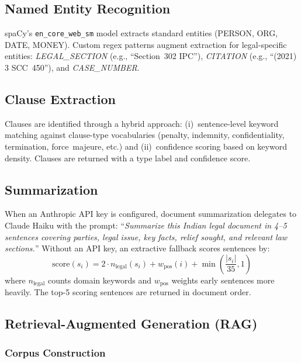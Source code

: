 \documentclass[conference]{IEEEtran}
\begin{document}
\subsection{Named Entity Recognition}

spaCy's \texttt{en\_core\_web\_sm} model extracts standard entities (PERSON,
ORG, DATE, MONEY). Custom regex patterns augment extraction for legal-specific
entities: \textit{LEGAL\_SECTION} (e.g., ``Section~302 IPC''),
\textit{CITATION} (e.g., ``(2021) 3 SCC~450''), and \textit{CASE\_NUMBER}.

\subsection{Clause Extraction}

Clauses are identified through a hybrid approach: (i)~sentence-level keyword
matching against clause-type vocabularies (penalty, indemnity, confidentiality,
termination, force~majeure, etc.) and (ii)~confidence scoring based on keyword
density. Clauses are returned with a type label and confidence score.

\subsection{Summarization}

When an Anthropic API key is configured, document summarization delegates to
Claude Haiku with the prompt: ``\textit{Summarize this Indian legal document in
4--5 sentences covering parties, legal issue, key facts, relief sought, and
relevant law sections.}'' Without an API key, an extractive fallback scores
sentences by:
\begin{equation}
  \text{score}(s_i) = 2 \cdot n_{\text{legal}}(s_i)
                    + w_{\text{pos}}(i)
                    + \min\!\left(\frac{|s_i|}{35},1\right)
\end{equation}
where $n_{\text{legal}}$ counts domain keywords and $w_{\text{pos}}$ weights
early sentences more heavily. The top-5 scoring sentences are returned in
document order.

\subsection{Retrieval-Augmented Generation (RAG)}

\subsubsection{Corpus Construction}
\end{document}
